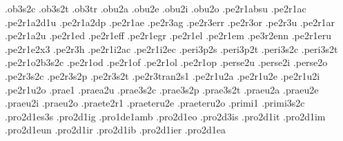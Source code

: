 {.ob3s2c                           %
.ob3s2t                           %
.ob3tr                            %
.obu2a .obu2e .obu2i .obu2o       %
.pe2r1absu                        %
.pe2r1ac                          %
.pe2r1a2d1u                       %
.pe2r1a2dp                        %
.pe2r1ae                          %
.pe2r3ag .pe2r3err .pe2r3or .pe2r3u   %
.pe2r1ar                          %
.pe2r1a2u                         %
.pe2r1ed                          %
.pe2r1eff                         %
.pe2r1egr                         %
.pe2r1el                          %
.pe2r1em                          %
.pe3r2enn                         %
.pe2r1eru                         %
.pe2r1e2x3                        %
.pe2r3h                           %
.pe2r1i2ac                        %
.pe2r1i2ec                        %
.peri3p2s                         %
.peri3p2t                         %
.peri3s2c                         %
.peri3s2t                         %
.pe2r1o2b3s2c                     %
.pe2r1od                          %
.pe2r1of                          %
.pe2r1ol                          %
.pe2r1op                          %
.perse2u .perse2i .perse2o        %
.pe2r3s2c                         %
.pe2r3s2p .pe2r3s2t               %
.pe2r3tran2s1                     %
.pe2r1u2a .pe2r1u2e .pe2r1u2i .pe2r1u2o %
.prae1
.praea2u                          %
.prae3s2c                         %
.prae3s2p                         %
.prae3s2t                         %
.praeu2a .praeu2e .praeu2i .praeu2o %
.praete2r1
.praeteru2e .praeteru2o           %
.primi1
.primi3s2c                        %
.pro2d1es3s .pro2d1ig             %
.pro1de1amb                       %
.pro2d1eo .pro2d3is .pro2d1it .pro2d1im .pro2d1eun .pro2d1ir 
.pro2d1ib .pro2d1ier .pro2d1ea    %
}
